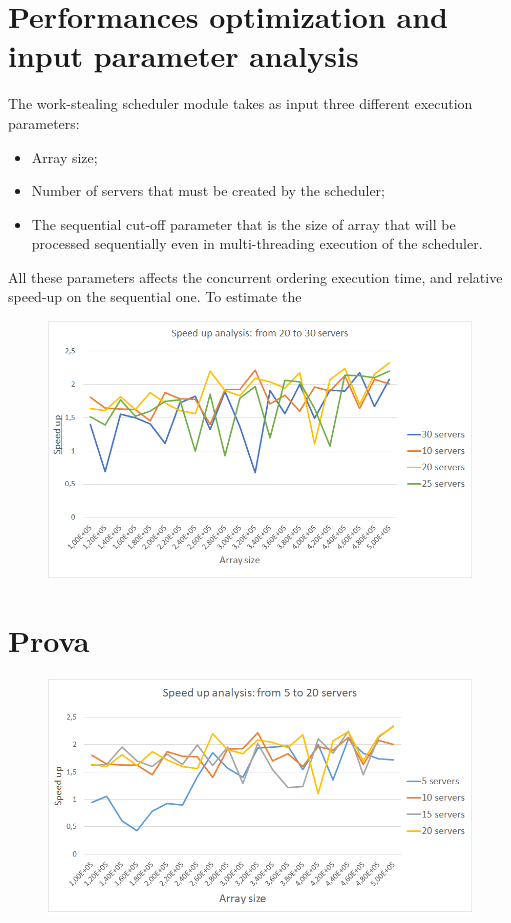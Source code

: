 \documentclass[twocolumn]{article}
\begin{document}
	
\section{Performances optimization and input parameter analysis}

The work-stealing scheduler module takes as input three different execution parameters: 
	\begin{itemize}
		\item Array size; 
		\item Number of servers that must be created by the scheduler;
		\item The sequential cut-off parameter that is the size of array that will be processed sequentially even in multi-threading execution of the scheduler. 
	\end{itemize}

All these parameters affects the concurrent ordering execution time, and relative speed-up on the sequential one. To estimate the 
\begin{figure}[h!]
		\centering
		\includegraphics[width=1.0\linewidth]{imgs/SpeedUP5-20server}
		\caption{}
		\label{fig:speedup5-20server}
\end{figure}
\section{Prova}


\begin{figure}[h!]
	\centering
	\includegraphics[width=1.0\linewidth]{imgs/SpeedUp20-30servers}
	\caption{}
	\label{fig:speedup20-30servers}
\end{figure}
\end{document}
